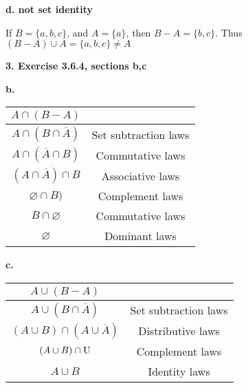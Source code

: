 \documentclass[11pt]{article}
\begin{document}
	\textbf{d. not set identity}
	
	If $B=\{a,b,c\}$, and $A=\{a\}$, then $B-A=\{b,c\}$. Thus $(B-A)\cup A=\{a,b,c\}\neq A$
	
	\vspace{10mm}
	\textbf{3. Exercise 3.6.4, sections b,c}
	
	\textbf{b.}
	\begin{center}
	\begin{tabular}{||c c||} 
    \hline
    $A\cap (B-A)$ & \\ [0.5ex] 
    \hline\hline
    $A\cap (B\cap \overline{A})$ & Set subtraction laws \\ 
    \hline
    $A\cap (\overline{A}\cap B)$ & Commutative laws \\
    \hline
    $(A\cap \overline{A})\cap B$ & Associative laws \\
    \hline
    $\varnothing\cap B)$ & Complement laws \\
    \hline
    $B\cap\varnothing$ & Commutative laws \\
    \hline
    $\varnothing$ & Dominant laws \\
    \hline
    \end{tabular}
	\end{center}
	
	\textbf{c.}
	\begin{center}
	\begin{tabular}{||c c||} 
    \hline
    $A\cup (B-A)$ & \\ [0.5ex] 
    \hline\hline
    $A\cup (B\cap \overline{A})$ & Set subtraction laws \\ 
    \hline
    $(A\cup B)\cap (A\cup \overline{A})$ & Distributive laws \\
    \hline
    $(A\cup B)\cap \rm{U}$ & Complement laws \\
    \hline
    $A\cup B$ & Identity laws \\
    \hline
    \end{tabular}
	\end{center}
	
\end{document}
